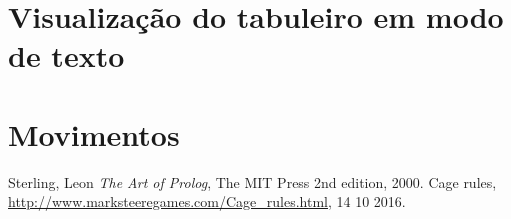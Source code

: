 \documentclass[a4paper,11pt]{article}
\begin{document}
\section{Visualização do tabuleiro em modo de texto}

\section{Movimentos}

\begin{thebibliography}{9}
  Sterling, Leon
  \emph{The Art of Prolog},
  The MIT Press
  2nd edition,
  2000.
  Cage rules,
  \url{http://www.marksteeregames.com/Cage_rules.html}, 14 10 2016.
\end{thebibliography}
\end{document}
